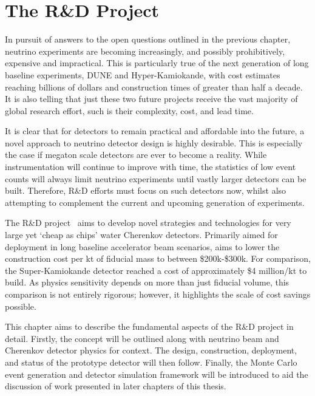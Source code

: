 \chapter{The \chips R\&D Project} %
\label{chap:chips}

In pursuit of answers to the open questions outlined in the previous chapter, neutrino experiments
are becoming increasingly, and possibly prohibitively, expensive and impractical. This is
particularly true of the next generation of long baseline experiments, DUNE and Hyper-Kamiokande,
with cost estimates reaching billions of dollars and construction times of greater than half a
decade. It is also telling that just these two future projects receive  the vast majority of
global research effort, such is their complexity, cost, and lead time.

It is clear that for detectors to remain practical and affordable into the future, a novel
approach to neutrino detector design is highly desirable. This is especially the case if megaton
scale detectors are ever to become a reality. While instrumentation will continue to improve with
time, the statistics of low event counts will always limit neutrino experiments until vastly
larger detectors can be built. Therefore, R\&D efforts must focus on such detectors now, whilst
also attempting to complement the current and upcoming generation of experiments.

The \chips R\&D project~\cite{adamson2013} aims to develop novel strategies and technologies for
very large yet `cheap as chips' water Cherenkov detectors. Primarily aimed for deployment in long
baseline accelerator beam scenarios, \chips aims to lower the construction cost per kt of fiducial
mass to between \$200k-\$300k. For comparison, the Super-Kamiokande detector reached a cost of
approximately \$4 million/kt to build. As physics sensitivity depends on more than just fiducial
volume, this comparison is not entirely rigorous; however, it highlights the scale of cost savings
possible.

This chapter aims to describe the fundamental aspects of the \chips R\&D project in detail.
Firstly, the \chips concept will be outlined along with neutrino beam and Cherenkov detector
physics for context. The design, construction, deployment, and status of the \chipsfive prototype
detector will then follow. Finally, the Monte Carlo event generation and detector simulation
framework will be introduced to aid the discussion of work presented in later chapters of this
thesis.

